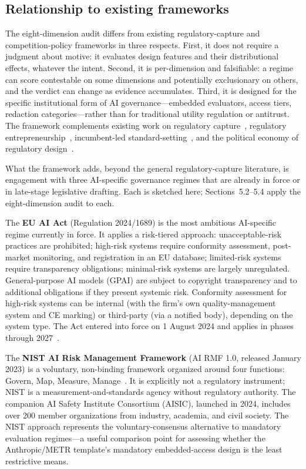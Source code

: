 \subsection{Relationship to existing frameworks}

The eight-dimension audit differs from existing regulatory-capture and competition-policy frameworks in three respects. First, it does not require a judgment about motive: it evaluates design features and their distributional effects, whatever the intent. Second, it is per-dimension and falsifiable: a regime can score contestable on some dimensions and potentially exclusionary on others, and the verdict can change as evidence accumulates. Third, it is designed for the specific institutional form of AI governance---embedded evaluators, access tiers, redaction categories---rather than for traditional utility regulation or antitrust. The framework complements existing work on regulatory capture~\cite{stigler1971}, regulatory entrepreneurship~\cite{jordana2004}, incumbent-led standard-setting~\cite{buthe2011}, and the political economy of regulatory design~\cite{carpenter2014,laffont1991}.

What the framework adds, beyond the general regulatory-capture literature, is engagement with three AI-specific governance regimes that are already in force or in late-stage legislative drafting. Each is sketched here; Sections~5.2--5.4 apply the eight-dimension audit to each.

The \textbf{EU AI Act} (Regulation 2024/1689) is the most ambitious AI-specific regime currently in force. It applies a risk-tiered approach: unacceptable-risk practices are prohibited; high-risk systems require conformity assessment, post-market monitoring, and registration in an EU database; limited-risk systems require transparency obligations; minimal-risk systems are largely unregulated. General-purpose AI models (GPAI) are subject to copyright transparency and to additional obligations if they present systemic risk. Conformity assessment for high-risk systems can be internal (with the firm's own quality-management system and CE marking) or third-party (via a notified body), depending on the system type. The Act entered into force on 1 August 2024 and applies in phases through 2027~\cite{euaiact2024}.

The \textbf{NIST AI Risk Management Framework} (AI RMF 1.0, released January 2023) is a voluntary, non-binding framework organized around four functions: Govern, Map, Measure, Manage~\cite{nist2023}. It is explicitly not a regulatory instrument; NIST is a measurement-and-standards agency without regulatory authority. The companion AI Safety Institute Consortium (AISIC), launched in 2024, includes over 200 member organizations from industry, academia, and civil society. The NIST approach represents the voluntary-consensus alternative to mandatory evaluation regimes---a useful comparison point for assessing whether the Anthropic/METR template's mandatory embedded-access design is the least restrictive means.

